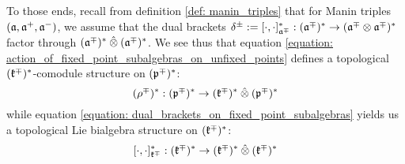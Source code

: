         To those ends, recall from definition \ref{def: manin_triples} that for Manin triples $(\mathfrak{a}, \mathfrak{a}^+, \mathfrak{a}^-)$, we assume that the dual brackets $\delta^{\pm} := [\cdot, \cdot]_{\a^{\mp}}^*: (\a^{\mp})^* \to (\a^{\mp} \tensor \a^{\mp})^*$ factor through $(\a^{\mp})^* \hattensor (\a^{\mp})^*$. We see thus that equation \eqref{equation: action_of_fixed_point_subalgebras_on_unfixed_points} defines a topological $(\mathfrak{k}^{\mp})^*$-comodule structure on $(\mathfrak{p}^{\mp})^*$:
            \begin{equation} \label{equation: coactions_on_dual_of_unfixed_points}
                (\rho^{\mp})^*: (\p^{\mp})^* \to (\k^{\mp})^* \hattensor (\p^{\mp})^*
            \end{equation}
        while equation \eqref{equation: dual_brackets_on_fixed_point_subalgebras} yields us a topological Lie bialgebra structure on $(\mathfrak{k}^{\mp})^*$:
            \begin{equation} \label{equation: cobrackets_on_fixed_points}
                [\cdot, \cdot]_{\k^{\mp}}^*: (\k^{\mp})^* \to (\k^{\mp})^* \hattensor (\k^{\mp})^*
            \end{equation}
        \begin{remark}
        \end{remark}
        
